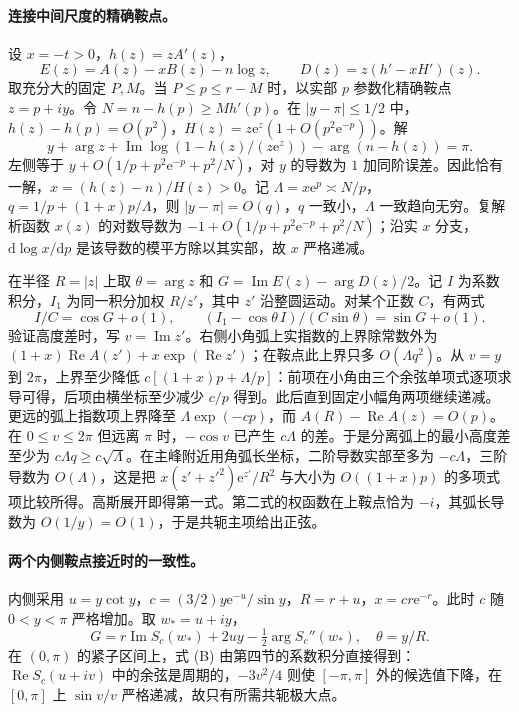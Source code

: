 \documentclass[UTF8,fontset=fandol,11pt,a4paper]{ctexart}
\newcommand{\Rea}{\operatorname{Re}}
\newcommand{\Ima}{\operatorname{Im}}
\newcommand{\expo}{\mathrm e}
\newcommand{\dd}{\mathrm d}
\begin{document}
\paragraph{连接中间尺度的精确鞍点。}
设 $x=-t>0$，$h(z)=zA'(z)$，
\[
 E(z)=A(z)-xB(z)-n\log z,\qquad
 D(z)=z(h'-xH')(z).
\]
取充分大的固定 $P,M$。当 $P\le p\le r-M$ 时，以实部 $p$ 参数化精确鞍点 $z=p+iy$。令 $N=n-h(p)\ge M h'(p)$。在 $|y-\pi|\le1/2$ 中，$h(z)-h(p)=O(p^2)$，$H(z)=z\expo^z(1+O(p^2\expo^{-p}))$。解
\[
 y+\arg z+\Ima\log(1-h(z)/(z\expo^z))-\arg(n-h(z))=\pi.
\]
左侧等于 $y+O(1/p+p^2\expo^{-p}+p^2/N)$，对 $y$ 的导数为 $1$ 加同阶误差。因此恰有一解，$x=(h(z)-n)/H(z)>0$。记 $\Lambda=x\expo^p\asymp N/p$，$q=1/p+(1+x)p/\Lambda$，则 $|y-\pi|=O(q)$，$q$ 一致小，$\Lambda$ 一致趋向无穷。复解析函数 $x(z)$ 的对数导数为 $-1+O(1/p+p^2\expo^{-p}+p^2/N)$；沿实 $x$ 分支，$\dd\log x/\dd p$ 是该导数的模平方除以其实部，故 $x$ 严格递减。

在半径 $R=|z|$ 上取 $\theta=\arg z$ 和 $G=\Ima E(z)-\arg D(z)/2$。记 $I$ 为系数积分，$I_1$ 为同一积分加权 $R/z'$，其中 $z'$ 沿整圆运动。对某个正数 $C$，有两式
\[
 I/C=\cos G+o(1),\qquad
 (I_1-\cos\theta\,I)/(C\sin\theta)=\sin G+o(1). \tag{B}
\]
验证高度差时，写 $v=\Ima z'$。右侧小角弧上实指数的上界除常数外为 $(1+x)\Rea A(z')+x\exp(\Rea z')$；在鞍点此上界只多 $O(\Lambda q^2)$。从 $v=y$ 到 $2\pi$，上界至少降低 $c[(1+x)p+\Lambda/p]$：前项在小角由三个余弦单项式逐项求导可得，后项由横坐标至少减少 $c/p$ 得到。此后直到固定小幅角两项继续递减。更远的弧上指数项上界降至 $\Lambda\exp(-cp)$，而 $A(R)-\Rea A(z)=O(p)$。在 $0\le v\le2\pi$ 但远离 $\pi$ 时，$-\cos v$ 已产生 $c\Lambda$ 的差。于是分离弧上的最小高度差至少为 $c\Lambda q\ge c\sqrt\Lambda$。在主峰附近用角弧长坐标，二阶导数实部至多为 $-c\Lambda$，三阶导数为 $O(\Lambda)$，这是把 $x(z'+z'^2)\expo^{z'}/R^2$ 与大小为 $O((1+x)p)$ 的多项式项比较所得。高斯展开即得第一式。第二式的权函数在上鞍点恰为 $-i$，其弧长导数为 $O(1/y)=O(1)$，于是共轭主项给出正弦。

\paragraph{两个内侧鞍点接近时的一致性。}
内侧采用 $u=y\cot y$，$c=(3/2)y\expo^{-u}/\sin y$，$R=r+u$，$x=cr\expo^{-r}$。此时 $c$ 随 $0<y<\pi$ 严格增加。取 $w_*=u+iy$，
\[
 G=r\Ima S_c(w_*)+2uy-\tfrac12\arg S_c''(w_*),\quad \theta=y/R.
\]
在 $(0,\pi)$ 的紧子区间上，式 (B) 由第四节的系数积分直接得到：$\Rea S_c(u+iv)$ 中的余弦是周期的，$-3v^2/4$ 则使 $[-\pi,\pi]$ 外的候选值下降，在 $[0,\pi]$ 上 $\sin v/v$ 严格递减，故只有所需共轭极大点。
\end{document}
